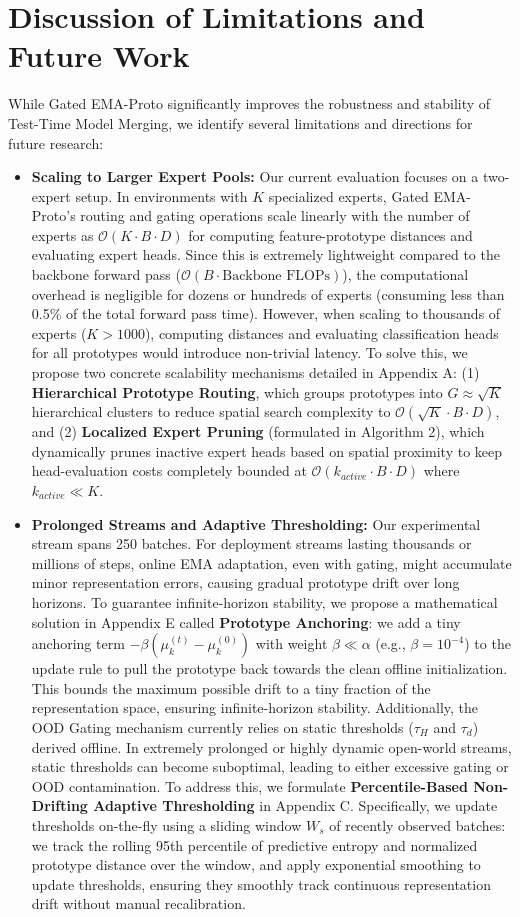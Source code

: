 \documentclass{article}
\theoremstyle{plain}
\theoremstyle{definition}
\theoremstyle{remark}
\begin{document}
\section{Discussion of Limitations and Future Work}
\label{sec:discussion}
While Gated EMA-Proto significantly improves the robustness and stability of Test-Time Model Merging, we identify several limitations and directions for future research:
\begin{itemize}
    \item \textbf{Scaling to Larger Expert Pools:} Our current evaluation focuses on a two-expert setup. In environments with $K$ specialized experts, Gated EMA-Proto's routing and gating operations scale linearly with the number of experts as $\mathcal{O}(K \cdot B \cdot D)$ for computing feature-prototype distances and evaluating expert heads. Since this is extremely lightweight compared to the backbone forward pass ($\mathcal{O}(B \cdot \text{Backbone FLOPs})$), the computational overhead is negligible for dozens or hundreds of experts (consuming less than 0.5\% of the total forward pass time). However, when scaling to thousands of experts ($K > 1000$), computing distances and evaluating classification heads for all prototypes would introduce non-trivial latency. To solve this, we propose two concrete scalability mechanisms detailed in Appendix A: (1) \textbf{Hierarchical Prototype Routing}, which groups prototypes into $G \approx \sqrt{K}$ hierarchical clusters to reduce spatial search complexity to $\mathcal{O}(\sqrt{K} \cdot B \cdot D)$, and (2) \textbf{Localized Expert Pruning} (formulated in Algorithm 2), which dynamically prunes inactive expert heads based on spatial proximity to keep head-evaluation costs completely bounded at $\mathcal{O}(k_{active} \cdot B \cdot D)$ where $k_{active} \ll K$.
    \item \textbf{Prolonged Streams and Adaptive Thresholding:} Our experimental stream spans 250 batches. For deployment streams lasting thousands or millions of steps, online EMA adaptation, even with gating, might accumulate minor representation errors, causing gradual prototype drift over long horizons. To guarantee infinite-horizon stability, we propose a mathematical solution in Appendix E called \textbf{Prototype Anchoring}: we add a tiny anchoring term $-\beta(\mu_k^{(t)} - \mu_k^{(0)})$ with weight $\beta \ll \alpha$ (e.g., $\beta = 10^{-4}$) to the update rule to pull the prototype back towards the clean offline initialization. This bounds the maximum possible drift to a tiny fraction of the representation space, ensuring infinite-horizon stability. Additionally, the OOD Gating mechanism currently relies on static thresholds ($\tau_H$ and $\tau_d$) derived offline. In extremely prolonged or highly dynamic open-world streams, static thresholds can become suboptimal, leading to either excessive gating or OOD contamination. To address this, we formulate \textbf{Percentile-Based Non-Drifting Adaptive Thresholding} in Appendix C. Specifically, we update thresholds on-the-fly using a sliding window $W_s$ of recently observed batches: we track the rolling 95th percentile of predictive entropy and normalized prototype distance over the window, and apply exponential smoothing to update thresholds, ensuring they smoothly track continuous representation drift without manual recalibration.

\end{itemize}
\end{document}
